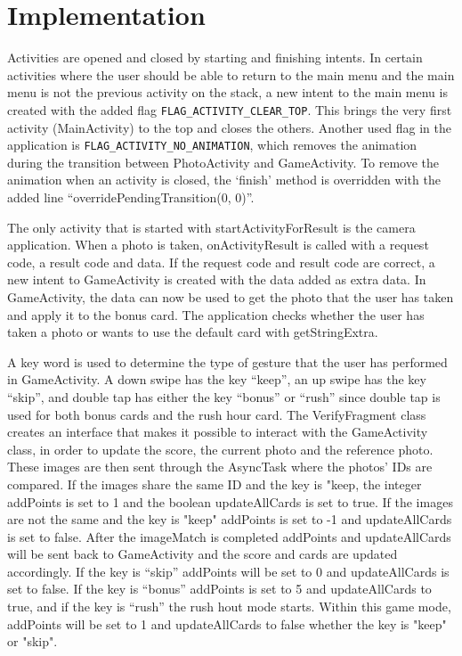 \section{Implementation}
Activities are opened and closed by starting and finishing intents. In certain activities where the user should be able to return to the main menu and the main menu is not the previous activity on the stack, a new intent to the main menu is created with the added flag \verb|FLAG_ACTIVITY_CLEAR_TOP|. This brings the very first activity (MainActivity) to the top and closes the others. Another used flag in the application is \verb|FLAG_ACTIVITY_NO_ANIMATION|, which removes the animation during the transition between PhotoActivity and GameActivity. To remove the animation when an activity is closed, the ‘finish’ method is overridden with the added line “overridePendingTransition(0, 0)”. \newline

The only activity that is started with startActivityForResult is the camera application. When a photo is taken, onActivityResult is called with a request code, a result code and data. If the request code and result code are correct, a new intent to GameActivity is created with the data added as extra data. In GameActivity, the data can now be used to get the photo that the user has taken and apply it to the bonus card. The application checks whether the user has taken a photo or wants to use the default card with getStringExtra. \newline

A key word is used to determine the type of gesture that the user has performed in GameActivity. A down swipe has the key “keep”, an up swipe has the key “skip”, and double tap has either the key “bonus” or “rush” since double tap is used for both bonus cards and the rush hour card.  The VerifyFragment class creates an interface that makes it possible to interact with the GameActivity class, in order to update the score, the current photo and the reference photo. These images are then sent through the AsyncTask where the photos' IDs are compared. If the images share the same ID and the key is "keep, the integer addPoints is set to 1 and the boolean updateAllCards is set to true. If the images are not the same and the key is "keep" addPoints is set to -1 and updateAllCards is set to false. After the imageMatch is completed addPoints and updateAllCards will be sent back to GameActivity and the score and cards are updated accordingly. If the key is “skip” addPoints will be set to 0 and updateAllCards is set to false. If the key is “bonus” addPoints is set to 5 and updateAllCards to true, and if the key is “rush” the rush hout mode starts. Within this game mode, addPoints will be set to 1 and updateAllCards to false whether the key is "keep" or "skip". \newline


